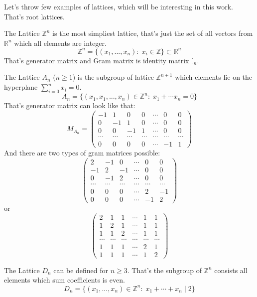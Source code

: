 \documentclass[a4paper, 12pt]{article}
\begin{document}
\par Let's throw few examples of lattices, which will be interesting in this work. That's root lattices.
\par The Lattice $\mathbb{Z}^n$ is the most simpliest lattice, that's just the set of all vectors from $\mathbb{R}^n$ which all elements are integer.
$$
	\mathbb{Z}^n = \{(x_1, ..., x_n):\; x_i\in\mathbb{Z}\} \subset \mathbb{R}^n
$$
That's generator matrix and Gram matrix is identity matrix $\mathbb{I}_n$. 
\par The Lattice $A_n$ ($n \ge 1$) is the subgroup of lattice $\mathbb{Z}^{n+1}$ which elements lie on the hyperplane $\sum\limits_{i=0}^n x_i = 0$.
$$
	A_n = \{(x_1, x_1, ..., x_n)\in \mathbb{Z}^n:\; x_1 + \cdots x_n = 0\}
$$
That's generator matrix can look like that:
$$
M_{A_n} = 
\begin{pmatrix}
	-1 & 1 & 0 & 0 & \cdots & 0 & 0 \\
	0 & -1 & 1 & 0 & \cdots & 0 & 0 \\
	0 & 0 & -1 & 1 & \cdots & 0 & 0 \\
	\cdots & \cdots & \cdots & \cdots & \cdots & \cdots & \cdots \\
	0 & 0 & 0 & 0 & \cdots & -1 & 1 
\end{pmatrix}
$$
And there are two types of gram matrices possible:
$$
\begin{pmatrix}
	2 & -1 & 0 & \cdots & 0 & 0 \\
	-1 & 2 & -1 & \cdots & 0 & 0 \\
	0 & -1 & 2 & \cdots & 0 & 0 \\
	\cdots & \cdots & \cdots & \cdots & \cdots & \cdots \\
	0 & 0 & 0 & \cdots & 2 & -1 \\
	0 & 0 & 0 & \cdots & -1 & 2 
\end{pmatrix}
$$
or
$$
\begin{pmatrix}
	2 & 1 & 1 & \cdots & 1 & 1 \\
	1 & 2 & 1 & \cdots & 1 & 1 \\
	1 & 1 & 2 & \cdots & 1 & 1 \\
	\cdots & \cdots & \cdots & \cdots & \cdots & \cdots \\
	1 & 1 & 1 & \cdots & 2 & 1 \\
	1 & 1 & 1 & \cdots & 1 & 2 
\end{pmatrix}
$$
\par The Lattice $D_n$ can be defined for $n \ge 3$. That's the subgroup of $\mathbb{Z}^n$ consists all elements which sum coefficients is even.
$$
	D_n = \{(x_1, ..., x_n)\in \mathbb{Z}^n:\; x_1 + \cdots + x_n \mid 2\}
$$
\end{document}
